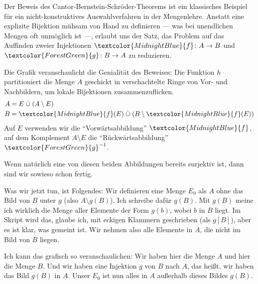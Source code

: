 \begin{didactic-insight}
Der Beweis des Cantor-Bernstein-Schröder-Theorems ist ein klassisches Beispiel für ein nicht-konstruktives Auswahlverfahren in der Mengenlehre. Anstatt eine explizite Bijektion mühsam von Hand zu definieren --- was bei unendlichen Mengen oft unmöglich ist ---, erlaubt uns der Satz, das Problem auf das Auffinden zweier Injektionen $\textcolor{MidnightBlue}{f} \colon A \to B$ und $\textcolor{ForestGreen}{g} \colon B \to A$ zu reduzieren. 

Die Grafik veranschaulicht die Genialität des Beweises: Die Funktion $h$ partitioniert die Menge $A$ geschickt in verschachtelte Ringe von Vor- und Nachbildern, um lokale Bijektionen zusammenzuflicken.
\begin{align*}
  A &= E \;\dot{\cup}\; (A \setminus E) \\
  B &= \textcolor{MidnightBlue}{f}(E) \;\dot{\cup}\; (B \setminus \textcolor{MidnightBlue}{f}(E))
\end{align*}
Auf $E$ verwenden wir die ``Vorwärtsabbildung'' $\textcolor{MidnightBlue}{f}$, auf dem Komplement $A \setminus E$ die ``Rückwärtsabbildung'' $\textcolor{ForestGreen}{g}^{-1}$.
\end{didactic-insight}

\begin{math-stroke}
\end{math-stroke}

\begin{spoken-clean}[00:24:22 - 00:26:00]
Wenn natürlich eine von diesen beiden Abbildungen bereits surjektiv ist, dann sind wir sowieso schon fertig. 

Was wir jetzt tun, ist Folgendes: Wir definieren eine Menge $E_0$ als $A$ ohne das Bild von $B$ unter $g$ (also $A \setminus g(B)$). Ich schreibe dafür $g(B)$. Mit $g(B)$ meine ich wirklich die Menge aller Elemente der Form $g(b)$, wobei $b$ in $B$ liegt. Im Skript wird das, glaube ich, mit eckigen Klammern geschrieben (als $g[B]$), aber es ist klar, was gemeint ist. Wir nehmen also alle Elemente in $A$, die nicht im Bild von $B$ liegen.

Ich kann das grafisch so veranschaulichen: Wir haben hier die Menge $A$ und hier die Menge $B$. Und wir haben eine Injektion $g$ von $B$ nach $A$, das heißt, wir haben das Bild $g(B)$ in $A$. Unser $E_0$ ist nun alles in $A$ außerhalb dieses Bildes $g(B)$.
\end{spoken-clean}

